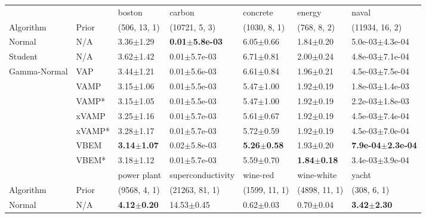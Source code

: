 \begin{tabular}{lllllll}
\toprule
             &       &                  boston &                     carbon &                concrete &                  energy &                         naval \\
Algorithm & Prior& (506, 13, 1)& (10721, 5, 3)& (1030, 8, 1)& (768, 8, 2)& (11934, 16, 2)\\
\midrule
Normal & N/A &           3.36$\pm$1.29 &  \textbf{0.01$\pm$5.8e-03} &           6.05$\pm$0.66 &           1.84$\pm$0.20 &           5.0e-03$\pm$4.3e-04 \\
Student & N/A &           3.62$\pm$1.42 &           0.01$\pm$5.7e-03 &           6.71$\pm$0.81 &           2.00$\pm$0.24 &           4.8e-03$\pm$7.1e-04 \\
Gamma-Normal & VAP &           3.44$\pm$1.21 &           0.01$\pm$5.6e-03 &           6.61$\pm$0.84 &           1.96$\pm$0.21 &           4.5e-03$\pm$7.5e-04 \\
             & VAMP &           3.15$\pm$1.06 &           0.01$\pm$5.5e-03 &           5.47$\pm$1.00 &           1.92$\pm$0.19 &           1.8e-03$\pm$1.4e-03 \\
             & VAMP* &           3.15$\pm$1.05 &           0.01$\pm$5.5e-03 &           5.47$\pm$1.00 &           1.92$\pm$0.19 &           2.2e-03$\pm$1.8e-03 \\
             & xVAMP &           3.25$\pm$1.16 &           0.01$\pm$5.7e-03 &           5.61$\pm$0.67 &           1.92$\pm$0.19 &           4.5e-03$\pm$7.4e-04 \\
             & xVAMP* &           3.28$\pm$1.17 &           0.01$\pm$5.7e-03 &           5.72$\pm$0.59 &           1.92$\pm$0.19 &           4.5e-03$\pm$7.0e-04 \\
             & VBEM &  \textbf{3.14$\pm$1.07} &           0.02$\pm$5.8e-03 &  \textbf{5.26$\pm$0.58} &           1.93$\pm$0.20 &  \textbf{7.9e-04$\pm$2.3e-04} \\
             & VBEM* &           3.18$\pm$1.12 &           0.01$\pm$5.7e-03 &           5.59$\pm$0.70 &  \textbf{1.84$\pm$0.18} &           3.4e-03$\pm$3.9e-04 \\
\midrule
             &       &             power plant &        superconductivity &                wine-red &              wine-white &                   yacht \\
Algorithm & Prior& (9568, 4, 1)& (21263, 81, 1)& (1599, 11, 1)& (4898, 11, 1)& (308, 6, 1)\\
\midrule
Normal & N/A &  \textbf{4.12$\pm$0.20} &           14.53$\pm$0.45 &           0.62$\pm$0.03 &           0.70$\pm$0.04 &  \textbf{3.42$\pm$2.30} \\

\end{tabular}
